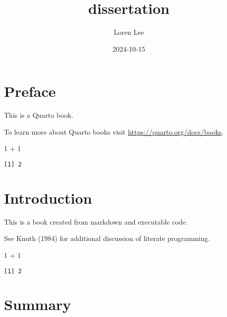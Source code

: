 \documentclass[
  letterpaper,
  DIV=11,
  numbers=noendperiod]{scrreprt}
\title{dissertation}
\author{Loren Lee}
\date{2024-10-15}
\newenvironment{Shaded}{\begin{snugshade}}{\end{snugshade}}
\newcommand{\DecValTok}[1]{\textcolor[rgb]{0.68,0.00,0.00}{#1}}
\newcommand{\SpecialCharTok}[1]{\textcolor[rgb]{0.37,0.37,0.37}{#1}}
\renewcommand*\contentsname{Table of contents}
\newcommand\contentsname{Table of contents}
\begin{document}
\maketitle

\renewcommand*\contentsname{Table of contents}
{
\hypersetup{linkcolor=}
\setcounter{tocdepth}{2}
\tableofcontents
}


\chapter*{Preface}\label{preface}


This is a Quarto book.

To learn more about Quarto books visit
\url{https://quarto.org/docs/books}.

\begin{Shaded}
\begin{Highlighting}[]
\DecValTok{1} \SpecialCharTok{+} \DecValTok{1}
\end{Highlighting}
\end{Shaded}

\begin{verbatim}
[1] 2
\end{verbatim}


\chapter{Introduction}\label{introduction}

This is a book created from markdown and executable code.

See Knuth (1984) for additional discussion of literate programming.

\begin{Shaded}
\begin{Highlighting}[]
\DecValTok{1} \SpecialCharTok{+} \DecValTok{1}
\end{Highlighting}
\end{Shaded}

\begin{verbatim}
[1] 2
\end{verbatim}


\chapter{Summary}\label{summary}
\end{document}
